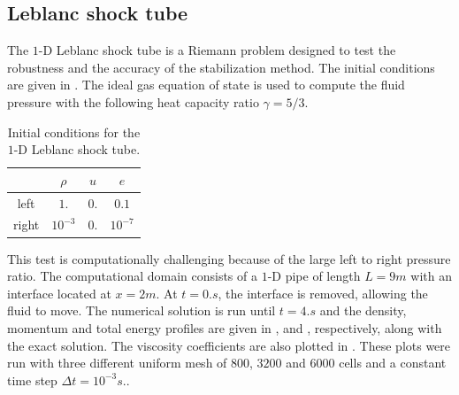 \subsection{Leblanc shock tube} \label{sec:Leblanc}
The $1$-D Leblanc shock tube is a Riemann problem designed to test the robustness and the accuracy of the stabilization method. The initial conditions are given in . The ideal gas equation of state is used to compute the fluid pressure with the following heat capacity ratio $\gamma=5/3$.
\begin{table}[H]
\begin{center}
 \caption{\label{tbl:ic_leblanc} Initial conditions for the $1$-D Leblanc shock tube.}
 \begin{tabular}{|c|c|c|c|}
 \hline
   & $\rho$ & $u$ & $e$ \\
 \hline
left & $1.$ & $0.$ & $0.1$ \\
  \hline
  right & $10^{-3}$ & $0.$ & $10^{-7}$ \\
  \hline
\end{tabular}
\end{center}
\nonumber
\end{table}
This test is computationally challenging because of the large left to right pressure ratio.
The computational domain consists of a $1$-D pipe of length $L=9m$ with an interface located at $x=2m$. At $t=0.s$, the interface is removed, allowing the fluid to move. The numerical solution is run until $t=4.s$ and the density, momentum and total energy profiles are given in ,  and , respectively, along with the exact solution. The viscosity coefficients are also plotted in . These plots were  run with three different uniform mesh of $800$, $3200$ and $6000$ cells and a constant time step $\Delta t = 10^{-3}s.$.
